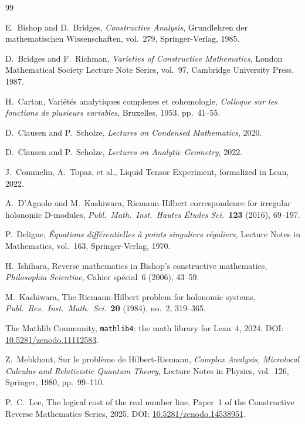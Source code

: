 \documentclass[11pt,a4paper]{article}
\theoremstyle{plain}
\theoremstyle{definition}
\begin{document}
\begin{thebibliography}{99}

E.~Bishop and D.~Bridges,
\textit{Constructive Analysis},
Grundlehren der mathematischen Wissenschaften, vol.~279,
Springer-Verlag, 1985.

D.~Bridges and F.~Richman,
\textit{Varieties of Constructive Mathematics},
London Mathematical Society Lecture Note Series, vol.~97,
Cambridge University Press, 1987.

H.~Cartan,
Variétés analytiques complexes et cohomologie,
\textit{Colloque sur les fonctions de plusieurs variables}, Bruxelles, 1953, pp.~41--55.

D.~Clausen and P.~Scholze,
\textit{Lectures on Condensed Mathematics},
2020.

D.~Clausen and P.~Scholze,
\textit{Lectures on Analytic Geometry},
2022.

J.~Commelin, A.~Topaz, et al.,
Liquid Tensor Experiment,
formalized in Lean, 2022.

A.~D'Agnolo and M.~Kashiwara,
Riemann-Hilbert correspondence for irregular holonomic D-modules,
\textit{Publ.\ Math.\ Inst.\ Hautes Études Sci.}~\textbf{123} (2016), 69--197.

P.~Deligne,
\textit{Équations différentielles à points singuliers réguliers},
Lecture Notes in Mathematics, vol.~163, Springer-Verlag, 1970.

H.~Ishihara,
Reverse mathematics in Bishop's constructive mathematics,
\textit{Philosophia Scientiae}, Cahier spécial~6 (2006), 43--59.

M.~Kashiwara,
The Riemann-Hilbert problem for holonomic systems,
\textit{Publ.\ Res.\ Inst.\ Math.\ Sci.}~\textbf{20} (1984), no.~2, 319--365.

The Mathlib Community,
\texttt{mathlib4}: the math library for Lean~4,
2024.
DOI: \href{https://doi.org/10.5281/zenodo.11112583}{10.5281/zenodo.11112583}.

Z.~Mebkhout,
Sur le problème de Hilbert-Riemann,
\textit{Complex Analysis, Microlocal Calculus and Relativistic Quantum Theory},
Lecture Notes in Physics, vol.~126, Springer, 1980, pp.~99--110.

P.~C.~Lee,
The logical cost of the real number line,
Paper~1 of the Constructive Reverse Mathematics Series,
2025.
DOI: \href{https://doi.org/10.5281/zenodo.14538951}{10.5281/zenodo.14538951}.


\end{thebibliography}
\end{document}
